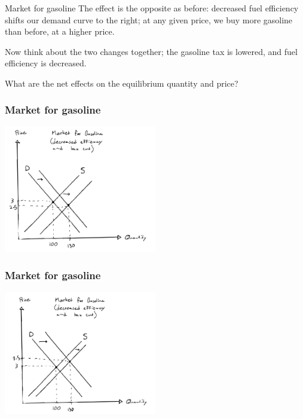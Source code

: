 \documentclass[aspectratio=169]{beamer}
\begin{document}
\begin{frame}{Market for gasoline}
    The effect is the opposite as before: decreased fuel efficiency shifts our demand curve to the right; at any given price, we buy more gasoline than before, at a higher price.

    \medskip

    Now think about the two changes together; the gasoline tax is lowered, and fuel efficiency is decreased. 
    
    \medskip

    What are the net effects on the equilibrium quantity and price?
\end{frame}

\begin{frame}
    \frametitle{Market for gasoline}
    \centering
    \includegraphics[width = 0.5\textwidth,keepaspectratio]{both_changes_2a.png}
\end{frame}

\begin{frame}
    \frametitle{Market for gasoline}
    \centering
    \includegraphics[width = 0.5\textwidth,keepaspectratio]{both_changes_2b.png}
\end{frame}
\end{document}
